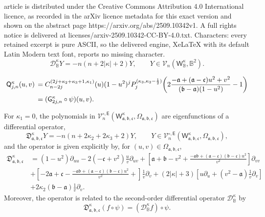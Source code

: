 \documentclass[10pt,a4paper]{amsart}
\def\BB{{\mathbb B}}
\def\CD{{\mathcal D}}
\def\CV{{\mathcal V}}
\def\fD{{\mathfrak D}}
\def\fa{{\mathfrak a}}
\def\fb{{\mathfrak b}}
\def\fc{{\mathfrak c}}
\def\f{\frac}
\def\k{{\kappa}}
\def\sE{{\mathsf E}}
\def\sG{{\mathsf G}}
\def\sQ{{\mathsf Q}}
\def\sW{{\mathsf W}}
\begin{document}
article is distributed under the Creative Commons Attribution 4.0 International licence, as recorded in the arXiv licence metadata for this exact version and shown on the abstract page https://arxiv.org/abs/2509.10342v1. A full rights notice is delivered at licenses/arxiv-2509.10342-CC-BY-4.0.txt. Characters: every retained excerpt is pure ASCII, so the delivered engine, XeLaTeX with its default Latin Modern text font, reports no missing character.
\begin{equation}\label{eq:eigenB2}
   \CD^\k_\BB Y = - n (n+ 2 |\k| + 2) Y, \qquad Y\in \CV_n(\sW^\k_\BB, \BB^2).
\end{equation}

\begin{align} \label{sQ-sG}
   \sQ_{j,n}^\k(u,v)\, &  = C_{n-2j}^{(2j + \k_2+\k_3 +1,\k_1)}(u) (1-u^2)^{j} 
   P_j^{(\k_3, \k_2-\f12)}\bigg(2 \frac{-\fa+(\fa-\fc)u^2+v^2}{(\fb-\fa)(1-u^2)} -1\bigg) \notag  \\
   \,& = (\sG_{2j,n}^\k \circ \psi) (u,v).
\end{align}

\begin{thm}\label{thm:PDE_d=2}
For $\k_1 =0$, the polynomials in $\CV_n^{\circ, \sE}(\sW_{\fa,\fb,\fc}^\k, \Omega_{\fa,\fb,\fc})$ 
are eigenfunctions of a differential operator, 
\begin{equation} \label{eq:spectral}
    \fD_{\fa,\fb,\fc}^\k Y = -n(n+ 2\k_2+2\k_3+ 2) Y, \qquad Y \in \CV_n^{\circ, \sE}(\sW_{\fa,\fb,\fc}^\k, \Omega_{\fa,\fb,\fc}),
\end{equation} 
and the operator is given explicitly by, for $(u,v) \in \Omega_{\fa,\fb,\fc}$, 
\begin{align*}
 \fD_{\fa,\fb,\fc}^\k \, & = (1-u^2) \partial_{uu} - 2(-\fc+v^2) \frac{u}{v} \partial_{u v} + \left[ \fa + \fb - v^2
       + \frac{- \fa \fb + (\fa - \fc) (\fb - \fc) u^2}{v^2}\right]\partial_{vv}\\
  & + \left[ -2\fa + \fc -\frac{- \fa \fb + (\fa - \fc) (\fb - \fc) u^2}{v^2} + \right]\frac{1}{v}\partial_{v} 
    + (2|\k|+3) \left[ u \partial_u + (v^2-\fa)\frac{1}{v}\partial_{v}\right]\\
  &  + 2 \k_2 (\fb-\fa) \frac{1}{v} \partial_v. 
\end{align*}
Moreover, the operator is related to the second-order differential operator $\CD_{\BB}^\k$ by 
\begin{equation} \label{eq:fD=D}
        \fD_{\fa,\fb,\fc}^\k (f\circ \psi) = \left(\CD_\BB^\k f \right) \circ \psi.   
\end{equation}
\end{thm} 
\end{document}
